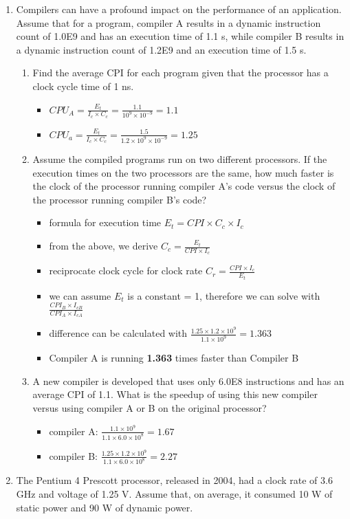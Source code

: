 \documentclass[10pt]{article}
\begin{document}
\begin{enumerate}
    \item Compilers can have a profound impact on the performance of an application. Assume that for a program, compiler A results in a dynamic instruction count of 1.0E9 and has an execution time of 1.1 s, while compiler B results in a dynamic instruction count of 1.2E9 and an execution time of 1.5 s.
    \begin{enumerate}
        \item Find the average CPI for each program given that the processor has a clock cycle time of 1 ns.
        \begin{itemize}
            \item $CPU_A = \frac{E_t}{I_c \times C_c} = \frac{1.1}{10^9 \times 10^{-9}} = 1.1$
            \item $CPU_a = \frac{E_t}{I_c \times C_c} = \frac{1.5}{1.2\times10^9\times10^{-9}} = 1.25$
        \end{itemize}
        \item Assume the compiled programs run on two different processors. If the execution times on the two processors are the same, how much faster is the clock of the processor running compiler A's code versus the clock of the processor running compiler B's code?
        \begin{itemize}
            \item formula for execution time $E_t = CPI \times C_c \times I_c$
            \item from the above, we derive $C_c = \frac{E_t}{CPI \times I_c}$
            \item reciprocate clock cycle for clock rate $C_r = \frac{CPI \times I_c}{E_t}$
            \item we can assume $E_t$ is a constant = 1, therefore we can solve with $\frac{CPI_B \times I_{cB}}{CPI_A \times I_{cA}}$
            \item difference can be calculated with $\frac{1.25 \times 1.2 \times 10^9}{1.1 \times 10^9} = 1.363$
            \item Compiler A is running \textbf{1.363} times faster than Compiler B
        \end{itemize}
        \item A new compiler is developed that uses only 6.0E8 instructions and has an average CPI of 1.1. What is the speedup of using this new compiler versus using compiler A or B on the original processor?
        \begin{itemize}
            \item compiler A: $\frac{1.1 \times 10^9}{1.1 \times 6.0 \times 10^8} = 1.67$
            \item compiler B: $\frac{1.25 \times 1.2 \times 10^9}{1.1 \times 6.0 \times 10^8} = 2.27$
        \end{itemize}
    \end{enumerate}
    \item The Pentium 4 Prescott processor, released in 2004, had a clock rate of 3.6 GHz and voltage of 1.25 V. Assume that, on average, it consumed 10 W of static power and 90 W of dynamic power.


\end{enumerate}
\end{document}
